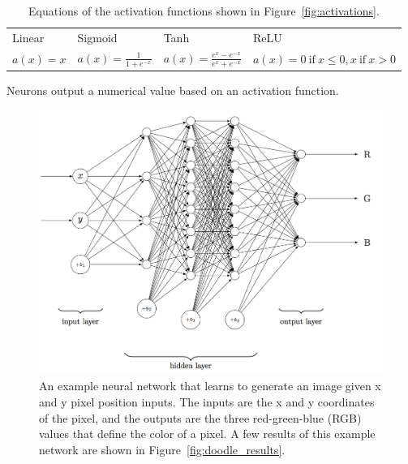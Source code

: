 \documentclass[12pt,oneside,onecolumn,a4paper]{article}
\begin{document}
\begin{table}[H]
\begin{center}
\caption{Equations of the activation functions shown in Figure~\ref{fig:activations}.}
\begin{tabular}{ l | l | l | l }
 Linear & Sigmoid & Tanh & ReLU\\ 
 $a(x) = x$ & $a(x) = \frac{1}{1+e^{-x}}$ & $a(x) = \frac{e^{x}-e^{-x}}{e^{x}+e^{-x}}$ & $a(x) = 0\ \textrm{if}\ x \leq 0, x\ \textrm{if}\ x > 0$\\   
\end{tabular}
\label{table:1}
\end{center}
\end{table}
Neurons output a numerical value based on an activation function.

\begin{figure}[H]
\begin{center}
\includegraphics[width=0.8\columnwidth]{figures/doodle}
\caption{An example neural network that learns to generate an image given x and y pixel position inputs. The inputs are the x and y coordinates of the pixel, and the outputs are the three red-green-blue (RGB) values that define the color of a pixel. A few results of this example network are shown in Figure~\ref{fig:doodle_results}.
\label{fig:doodle}
}
\end{center}
\end{figure}
\end{document}
